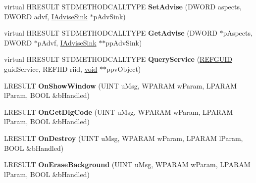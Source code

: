 \begin{DoxyCompactItemize}
\item 
\mbox{\label{class_c_def_view_a1b102aa12d66747ab0664bb4f0593c41}} 
virtual H\+R\+E\+S\+U\+LT S\+T\+D\+M\+E\+T\+H\+O\+D\+C\+A\+L\+L\+T\+Y\+PE {\bfseries Set\+Advise} (D\+W\+O\+RD aspects, D\+W\+O\+RD advf, \hyperlink{interface_i_advise_sink}{I\+Advise\+Sink} $\ast$p\+Adv\+Sink)
\item 
\mbox{\label{class_c_def_view_ad9129d0101e091a469252ccacdf70c37}} 
virtual H\+R\+E\+S\+U\+LT S\+T\+D\+M\+E\+T\+H\+O\+D\+C\+A\+L\+L\+T\+Y\+PE {\bfseries Get\+Advise} (D\+W\+O\+RD $\ast$p\+Aspects, D\+W\+O\+RD $\ast$p\+Advf, \hyperlink{interface_i_advise_sink}{I\+Advise\+Sink} $\ast$$\ast$pp\+Adv\+Sink)
\item 
\mbox{\label{class_c_def_view_a0499a9e2a7ba5bbd22e12c628bb648d4}} 
virtual H\+R\+E\+S\+U\+LT S\+T\+D\+M\+E\+T\+H\+O\+D\+C\+A\+L\+L\+T\+Y\+PE {\bfseries Query\+Service} (\hyperlink{struct___g_u_i_d}{R\+E\+F\+G\+U\+ID} guid\+Service, R\+E\+F\+I\+ID riid, \hyperlink{interfacevoid}{void} $\ast$$\ast$ppv\+Object)
\item 
\mbox{\label{class_c_def_view_a0aa5e633ddd1f7bd5fecc2d045bb3b0c}} 
L\+R\+E\+S\+U\+LT {\bfseries On\+Show\+Window} (U\+I\+NT u\+Msg, W\+P\+A\+R\+AM w\+Param, L\+P\+A\+R\+AM l\+Param, B\+O\+OL \&b\+Handled)
\item 
\mbox{\label{class_c_def_view_a481b5e6c6ea4eeeb9061a3f64c946f4f}} 
L\+R\+E\+S\+U\+LT {\bfseries On\+Get\+Dlg\+Code} (U\+I\+NT u\+Msg, W\+P\+A\+R\+AM w\+Param, L\+P\+A\+R\+AM l\+Param, B\+O\+OL \&b\+Handled)
\item 
\mbox{\label{class_c_def_view_aa88f90f0339547065036260276ccbe9d}} 
L\+R\+E\+S\+U\+LT {\bfseries On\+Destroy} (U\+I\+NT u\+Msg, W\+P\+A\+R\+AM w\+Param, L\+P\+A\+R\+AM l\+Param, B\+O\+OL \&b\+Handled)
\item 
\mbox{\label{class_c_def_view_a93782568955a4b624dc4bf55abb8cfa1}} 
L\+R\+E\+S\+U\+LT {\bfseries On\+Erase\+Background} (U\+I\+NT u\+Msg, W\+P\+A\+R\+AM w\+Param, L\+P\+A\+R\+AM l\+Param, B\+O\+OL \&b\+Handled)
\item 
\mbox{\label{class_c_def_view_a1c451b6e96584b26dda4e1f09e9cdd3a}} 

\end{DoxyCompactItemize}
